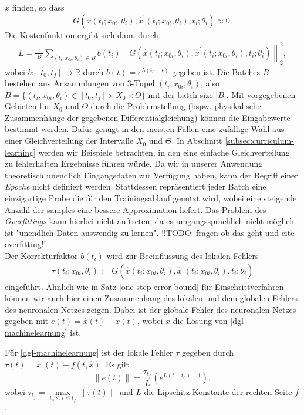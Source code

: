 $\hat{x}$ finden, so dass
\[
    G(\hat{x}(t_i;x_{0i},\theta_i), \hat{x}^{\prime}(t_i;x_{0i},\theta_i),t_i;\theta_i) \approx 0.
\]
Die Kostenfunktion ergibt sich dann durch
\begin{align}
    \label{cost-func}
    L = \frac{1}{|B|} \sum_{(t_i,x_{0i},\theta_i) \in B} b(t_i)
    \left\lVert G(\hat{x}(t_i;x_{0i},\theta_i), \hat{x}^{\prime}(t_i;x_{0i},\theta_i),t_i;\theta_i) \right\rVert_2^2,
\end{align}
wobei $b:[t_0,t_f] \rightarrow \mathbb{R}$ durch $b(t) = e^{\lambda (t_0 - t)}$ gegeben ist. Die Batches \textit{B}
bestehen aus Ansammlungen von 3-Tupel $(t_i,x_{0i},\theta_i)$, also
$B=\{(t_i,x_{0i},\theta_i) \in [t_0,t_f] \times X_0 \times \Theta\}$ mit der batch size $|B|$. Mit vorgegebenen Gebieten
für $X_0$ und $\Theta$ durch die Problemstellung (bspw. physikalische Zusammenhänge der gegebenen Differentialgleichung)
können die Eingabewerte bestimmt werden. Dafür genügt in den meisten Fällen eine zufällige Wahl aus einer
Gleichverteilung der Intervalle $X_0$ und $\Theta$. In Abschnitt \eqref{subsec:curriculum-learning} werden wir Beispiele
betrachten, in den eine einfache Gleichverteilung zu fehlerhaften Ergebnisse führen würde. Da wir in unserer Anwendung
theoretisch unendlich Eingangsdaten zur Verfügung haben, kann der Begriff einer \textit{Epoche} nicht definiert werden.
Stattdessen repräsentiert jeder Batch eine einzigartige Probe die für den Trainingsablauf genutzt wird, wobei eine
steigende Anzahl der samples eine bessere Approximation liefert. Das Problem des \textit{Overfittings} kann hierbei
nicht auftreten, da es umgangssprachlich nicht möglich ist "unendlich Daten auswendig zu lernen". !!TODO: fragen ob das
geht und cite overfitting!!\\
Der Korrekturfaktor $b(t_i)$ wird zur Beeinflussung des lokalen Fehlers
\begin{align*}
    \tau(t_i;x_{0i}, \theta_i)
    := G \left( \hat{x}(t_i;x_{0i}, \theta_i), \hat{x}^{\prime}(t_i;x_{0i}, \theta_i),t_i;\theta_i \right)
\end{align*}
eingeführt. Ähnlich wie in Satz \eqref{one-step-error-bound} für Einschrittverfahren können wir auch hier einen
Zusammenhang des lokalen und dem globalen Fehlers des neuronalen Netzes zeigen. Dabei ist der globale Fehler des
neuronalen Netzes gegeben mit $e(t) = \hat{x}(t) - x(t)$, wobei $x$ die Lösung von \eqref{dgl-machinelearnung} ist.
\begin{satz}
    Für \eqref{dgl-machinelearnung} ist der lokale Fehler $\tau$ gegeben durch
    $\tau(t) = \hat{x}^{\prime}(t) - f(t,\hat{x})$. Es gilt
    \[
        \left\lVert e(t) \right\rVert = \frac{\tau_{t_f}}{L} \left( e^{L(t-t_0) - 1} \right),
    \]
    wobei $\tau_{t_f} = \max\limits_{t_0 \leq t \leq t_f} \left\lVert \tau(t) \right\rVert$ und $L$ die
    Lipschitz-Konstante der rechten Seite $f$.
\end{satz}
